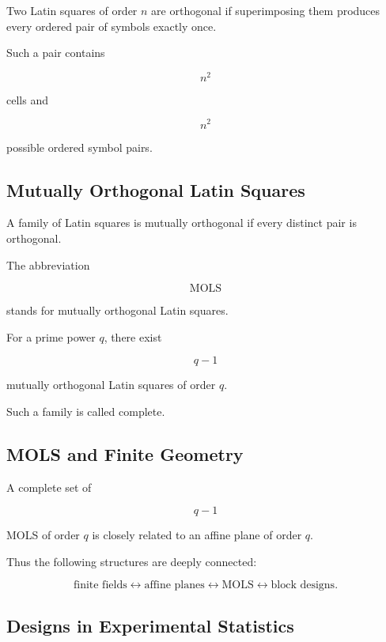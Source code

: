 Two Latin squares of order \(n\) are orthogonal if superimposing them
produces every ordered pair of symbols exactly once.

Such a pair contains

\[
n^2
\]

cells and

\[
n^2
\]

possible ordered symbol pairs.

\subsection{Mutually Orthogonal Latin Squares}
\label{subsec:mols}

A family of Latin squares is mutually orthogonal if every distinct pair
is orthogonal.

The abbreviation

\[
\boxed{
\text{MOLS}
}
\]

stands for mutually orthogonal Latin squares.

For a prime power \(q\), there exist

\[
\boxed{
q-1
}
\]

mutually orthogonal Latin squares of order \(q\).

Such a family is called complete.

\subsection{MOLS and Finite Geometry}
\label{subsec:mols-finite-geometry}

A complete set of

\[
q-1
\]

MOLS of order \(q\) is closely related to an affine plane of order
\(q\).

Thus the following structures are deeply connected:

\[
\boxed{
\text{finite fields}
\longleftrightarrow
\text{affine planes}
\longleftrightarrow
\text{MOLS}
\longleftrightarrow
\text{block designs}.
}
\]

\subsection{Designs in Experimental Statistics}
\label{subsec:designs-experimental-statistics}

